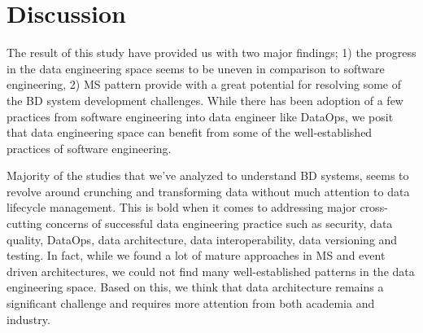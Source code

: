 \documentclass{bmcart}
\begin{document}
\section{Discussion}



The result of this study have provided us with two major findings; 1) the progress in the data engineering space seems to be uneven in comparison to software engineering, 2) MS pattern provide with a great potential for resolving some of the BD system development challenges. While there has been adoption of a few practices from software engineering into data engineer like DataOps, we posit that data engineering space can benefit from some of the well-established practices of software engineering. 

Majority of the studies that we've analyzed to understand BD systems, seems to revolve around crunching and transforming data without much attention to data lifecycle management. This is bold when it comes to addressing major cross-cutting concerns of successful data engineering practice such as security, data quality, DataOps, data architecture, data interoperability, data versioning and testing. In fact, while we found a lot of mature approaches in MS and event driven architectures, we could not find many well-established patterns in the data engineering space. Based on this, we think that data architecture remains a significant challenge and requires more attention from both academia and industry. 
\end{document}
